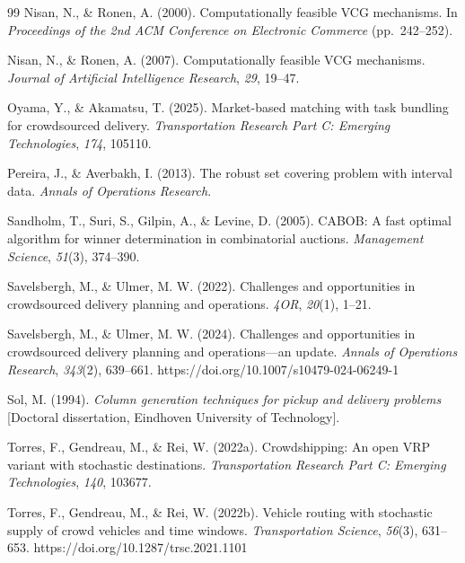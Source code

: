 \begin{singlespace}
\begin{thebibliography}{99}
Nisan, N., \& Ronen, A. (2000). Computationally feasible VCG mechanisms. In
\emph{Proceedings of the 2nd ACM Conference on Electronic Commerce}
(pp.~242--252).

Nisan, N., \& Ronen, A. (2007). Computationally feasible VCG mechanisms.
\emph{Journal of Artificial Intelligence Research}, \emph{29}, 19--47.

Oyama, Y., \& Akamatsu, T. (2025). Market-based matching with task bundling
for crowdsourced delivery. \emph{Transportation Research Part C: Emerging
Technologies}, \emph{174}, 105110. %

Pereira, J., \& Averbakh, I. (2013). The robust set covering problem with
interval data. \emph{Annals of Operations Research}.

Sandholm, T., Suri, S., Gilpin, A., \& Levine, D. (2005). CABOB: A fast
optimal algorithm for winner determination in combinatorial auctions.
\emph{Management Science}, \emph{51}(3), 374--390.

Savelsbergh, M., \& Ulmer, M. W. (2022). Challenges and opportunities in
crowdsourced delivery planning and operations. \emph{4OR}, \emph{20}(1),
1--21.

Savelsbergh, M., \& Ulmer, M. W. (2024). Challenges and opportunities in
crowdsourced delivery planning and operations---an update. \emph{Annals of
Operations Research}, \emph{343}(2), 639--661.
https://doi.org/10.1007/s10479-024-06249-1

Sol, M. (1994). \emph{Column generation techniques for pickup and delivery
problems} [Doctoral dissertation, Eindhoven University of Technology].

Torres, F., Gendreau, M., \& Rei, W. (2022a). Crowdshipping: An open VRP
variant with stochastic destinations. \emph{Transportation Research Part C:
Emerging Technologies}, \emph{140}, 103677.

Torres, F., Gendreau, M., \& Rei, W. (2022b). Vehicle routing with
stochastic supply of crowd vehicles and time windows. \emph{Transportation
Science}, \emph{56}(3), 631--653. https://doi.org/10.1287/trsc.2021.1101


\end{thebibliography}
\end{singlespace}
